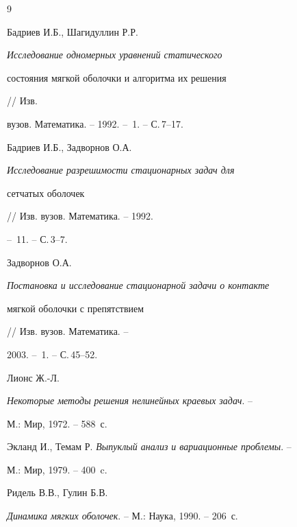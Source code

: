 \begin{thebibliography} {9}







Бадриев И.Б., Шагидуллин Р.Р.


{\em Исследование одномерных уравнений статического


состояния мягкой оболочки и алгоритма их решения} // Изв.


вузов. Математика. -- 1992. -- \No\,1. -- С.\,7--17.







Бадриев И.Б., Задворнов О.А.


{\em Исследование разрешимости стационарных задач для


сетчатых оболочек} // Изв. вузов. Математика. -- 1992.


-- \No\,11. -- С.\,3--7.







Задворнов О.А.


{\em Постановка и исследование стационарной задачи о контакте


мягкой оболочки с препятствием} // Изв. вузов. Математика.  -- 


2003. -- \No\,1. -- С.\,45--52.







Лионс Ж.-Л.


{\em Некоторые методы решения нелинейных краевых задач}.  -- 


М.: Мир, 1972. -- 588~с.







Экланд И., Темам Р. {\em Выпуклый анализ и вариационные проблемы}.  -- 


М.: Мир, 1979. -- 400~c.







Ридель В.В., Гулин Б.В.


{\em Динамика мягких оболочек}. --  М.: Наука, 1990. -- 206~с.






\end{thebibliography}
